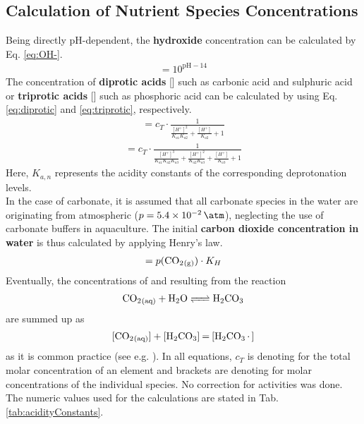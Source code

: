 \documentclass[11pt]{scrartcl}
\begin{document}
\subsection{Calculation of Nutrient Species Concentrations}
Being directly pH-dependent, the \textbf{hydroxide} concentration can be calculated by Eq. \ref{eq:OH-}.
%
\begin{align}
	[\ce{OH-}] = 10^{\text{pH}-14}
	\label{eq:OH-}
\end{align}
%
The concentration of \textbf{diprotic acids} [] such as carbonic acid  and sulphuric acid  or \textbf{triprotic acids} [] such as phosphoric acid  can be calculated by using Eq. \ref{eq:diprotic} and \ref{eq:triprotic}, respectively.
%
\begin{align}
	[A^{2-}] = c_T \cdot \frac{1}{\frac{[H^+]^2}{K_{a1}K_{a2}}+\frac{[H^+]}{K_{a2}}+1}
	\label{eq:diprotic}
\end{align}
%
\begin{align}
	[A^{3-}] = c_T \cdot \frac{1}{\frac{[H^+]^3}{K_{a1}K_{a2}K_{a3}}+\frac{[H^+]^2}{K_{a2}K_{a3}}+\frac{[H^+]}{K_{a3}}+1}
		\label{eq:triprotic}
\end{align}
%
Here, $K_{a,n}$ represents the acidity constants of the corresponding deprotonation levels.\\
In the case of carbonate, it is assumed that all carbonate species in the water are originating from atmospheric  ($p = \SI{5.4e-2}{\atm}$), neglecting the use of carbonate buffers in aquaculture. The initial \textbf{carbon dioxide concentration in water} is thus calculated by applying Henry's law.
%
\begin{align}
	[\ce{CO2_{(aq)}}] = p(\ce{CO2_{(g)}}) \cdot K_{H}
\end{align}
%
Eventually, the concentrations of  and  resulting from the reaction
%
\begin{align}
	\ce{CO2_{(aq)} + H2O <=> H2CO3}	
\end{align}
%
are summed up as 
%
\begin{align}
	\ce{[CO2_{(aq)}] + [H2CO3] = [H2CO3*]}	
\end{align}
%
as it is common practice (see e.g. \cite{Sigg2011}). In all equations, $c_{T}$ is denoting for the total molar concentration of an element and brackets are denoting for molar concentrations of the individual species. No correction for activities was done. The numeric values used for the calculations are stated in Tab. \ref{tab:acidityConstants}.
\end{document}
